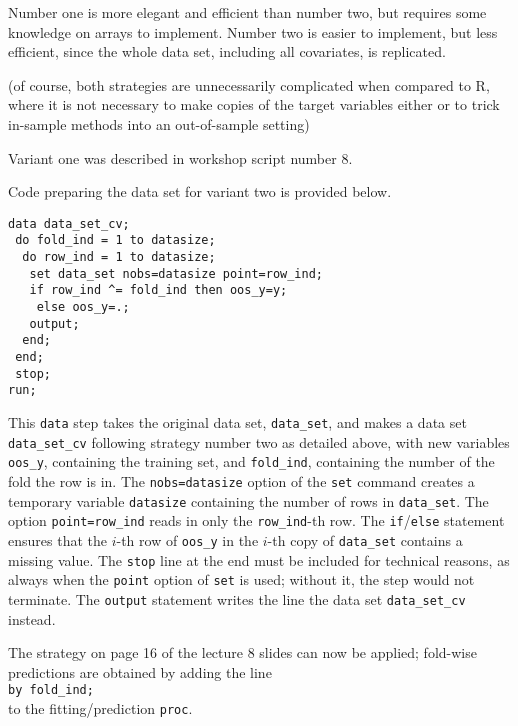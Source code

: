 Number one is more elegant and efficient than number two, but requires some knowledge on arrays to implement. Number two is easier to implement, but less efficient, since the whole data set, including all covariates, is replicated.

(of course, both strategies are unnecessarily complicated when compared to R, where it is not necessary to make copies of the target variables either or to trick in-sample methods into an out-of-sample setting)

Variant one was described in workshop script number 8.

Code preparing the data set for variant two is provided below.
\begin{verbatim}
data data_set_cv;
 do fold_ind = 1 to datasize;
  do row_ind = 1 to datasize;
   set data_set nobs=datasize point=row_ind;
   if row_ind ^= fold_ind then oos_y=y;
    else oos_y=.;
   output;
  end;
 end;
 stop;
run;
\end{verbatim}
This \texttt{data} step takes the original data set, \texttt{data\_set}, and makes a data set \texttt{data\_set\_cv} following strategy number two as detailed above, with new variables \texttt{oos\_y}, containing the training set, and \texttt{fold\_ind}, containing the number of the fold the row is in. The \texttt{nobs=datasize} option of the \texttt{set} command creates a temporary variable \texttt{datasize} containing the number of rows in \texttt{data\_set}. The option \texttt{point=row\_ind} reads in only the \texttt{row\_ind}-th row. The \texttt{if}/\texttt{else} statement ensures that the $i$-th row of \texttt{oos\_y} in the $i$-th copy of \texttt{data\_set} contains a missing value. The \texttt{stop} line at the end must be included for technical reasons, as always when the \texttt{point} option of \texttt{set} is used; without it, the step would not terminate. The \texttt{output} statement writes the line the data set \texttt{data\_set\_cv} instead.

The strategy on page 16 of the lecture 8 slides can now be applied; fold-wise predictions are obtained by adding the line\\
\texttt{by fold\_ind;}\\
to the fitting/prediction \texttt{proc}.


